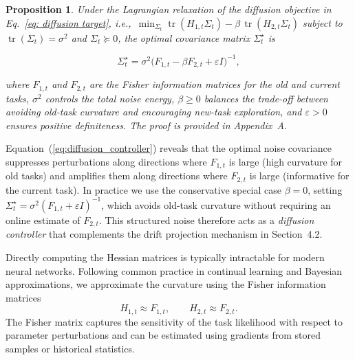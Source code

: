 \documentclass{article}
\newtheorem{proposition}{Proposition}
\begin{document}
\begin{proposition}
Under the Lagrangian relaxation of the diffusion objective in Eq.~\eqref{eq: diffusion target}, i.e.,\ $\min_{\Sigma_t} \operatorname{tr}(H_{1,t}\Sigma_t) - \beta\,\operatorname{tr}(H_{2,t}\Sigma_t)$ subject to $\operatorname{tr}(\Sigma_t)=\sigma^2$ and $\Sigma_t\succeq 0$, the optimal covariance matrix $\Sigma_t^\star$ is

\begin{equation}
\Sigma_t^\star
=
\sigma^2
\bigl(F_{1,t} - \beta F_{2,t} + \varepsilon I\bigr)^{-1},
\label{eq:diffusion_controller}
\end{equation}

where $F_{1,t}$ and $F_{2,t}$ are the Fisher information matrices for the old and current tasks, $\sigma^2$ controls the total noise energy, $\beta\geq 0$ balances the trade-off between avoiding old-task curvature and encouraging new-task exploration, and $\varepsilon>0$ ensures positive definiteness. The proof is provided in Appendix~A.
\end{proposition}

Equation~(\ref{eq:diffusion_controller}) reveals that the optimal noise covariance suppresses perturbations along directions where $F_{1,t}$ is large (high curvature for old tasks) and amplifies them along directions where $F_{2,t}$ is large (informative for the current task). In practice we use the conservative special case $\beta=0$, setting $\Sigma_t^\star = \sigma^2(F_{1,t}+\varepsilon I)^{-1}$, which avoids old-task curvature without requiring an online estimate of $F_{2,t}$.
This structured noise therefore acts as a \emph{diffusion controller} that complements the drift projection mechanism in Section~4.2. 




Directly computing the Hessian matrices is typically intractable for modern neural networks.
Following common practice in continual learning and Bayesian approximations, we approximate the curvature using the Fisher information matrices
\begin{equation}
H_{1,t} \approx F_{1,t}, 
\qquad
H_{2,t} \approx F_{2,t}.
\end{equation}
The Fisher matrix captures the sensitivity of the task likelihood with respect to parameter perturbations and can be estimated using gradients from stored samples or historical statistics.

\end{document}
